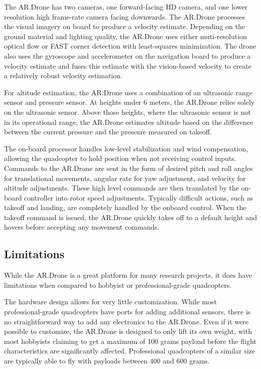 The AR.Drone has two cameras, one forward-facing HD camera, and one lower resolution high frame-rate camera facing downwards. The AR.Drone processes the visual imagery on board to produce a velocity estimate. Depending on the ground material and lighting quality, the AR.Drone uses either muti-resolution optical flow or FAST corner detection with least-squares minimization. The drone also uses the gyroscope and accelerometer on the navigation board to produce a velocity estimate and fuses this estimate with the vision-based velocity to create a relatively robust velocity estimation.\cite{Bristeau} %

For altitude estimation, the AR.Drone uses a combination of an ultrasonic range sensor and pressure sensor. At heights under 6 meters, the AR.Drone relies solely on the ultrasonic sensor. Above those heights, where the ultrasonic sensor is not in its operational range, the AR.Drone estimates altitude based on the difference between the current pressure and the pressure measured on takeoff. 

The on-board processor handles low-level stabilization and wind compensation, allowing the quadcopter to hold position when not receiving control inputs. Commands to the AR.Drone are sent in the form of desired pitch and roll angles for translational movements, angular rate for yaw adjustment, and velocity for altitude adjustments. These high level commands are then translated by the on-board controller into rotor speed adjustments. Typically difficult actions, such as takeoff and landing, are completely handled by the onboard control. When the takeoff command is issued, the AR.Drone quickly takes off to a default height and hovers before accepting any movement commands.

\subsection{Limitations}

While the AR.Drone is a great platform for many research projects, it does have limitations when compared to hobbyist or professional-grade quadcopters.

The hardware design allows for very little customization. While most professional-grade quadcopters have ports for adding additional sensors, there is no straightforward way to add any electronics to the AR.Drone. Even if it were possible to customize, the AR.Drone is designed to only lift its own weight, with most hobbyists claiming to get a maximum of 100 grams payload before the flight characteristics are significantly affected.\cite{Forums} Professional quadcopters of a similar size are typically able to fly with payloads between 400 and 600 grams.\cite{Mikrocopter}

